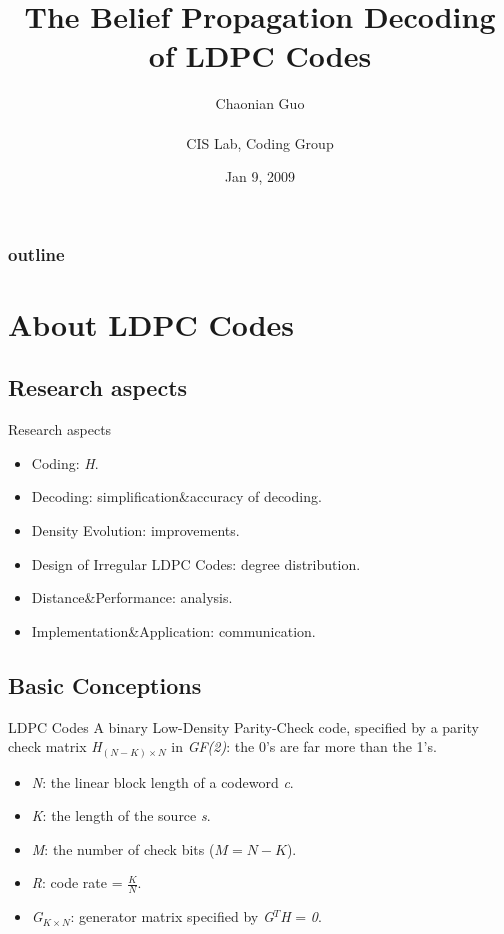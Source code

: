 \documentclass{beamer}
\title[]
{The Belief Propagation Decoding of LDPC Codes}
\author[]
{
Chaonian Guo\\
 \quad\\
\scriptsize{CIS Lab, Coding Group } }
\date
{Jan 9, 2009}
\newcommand{\xieti}{\textsl}
\begin{document}
\begin{frame}
  \titlepage
\end{frame}

\begin{frame}
  \frametitle{outline}
  \tableofcontents
\end{frame}

\section{About LDPC Codes}

\subsection{Research aspects}

\begin{frame}{Research aspects}
    \begin{itemize}
    \item Coding: \xieti{H}.
    \item Decoding: simplification\&accuracy of decoding.
    \item Density Evolution: improvements.
    \item Design of Irregular LDPC Codes: degree distribution.
    \item Distance\&Performance: analysis.
    \item Implementation\&Application: communication.
    \end{itemize}
\end{frame}

\subsection{Basic Conceptions}
\begin{frame}
    \begin{block}{LDPC Codes}
        A binary Low-Density Parity-Check code, specified by a parity check matrix
        \xieti{H$_{(N-K)\times N}$} in \xieti{GF(2)}: the 0's are far more than the 1's.
        \begin{itemize}
            \item \xieti{N}: the linear block length of a codeword \xieti{c}.
            \item \xieti{K}: the length of the source \xieti{s}.
            \item \xieti{M}: the number of check bits ($M = N-K$).
            \item \xieti{R}: code rate = $\frac{K}{N}$.
            \item \xieti{G$_{K\times N}$}: generator matrix specified by \xieti{G$^T$H} = \xieti{0}.
        \end{itemize}
    \end{block}
\end{frame}
\end{document}
